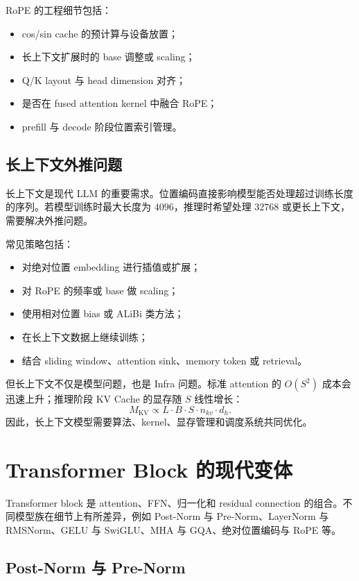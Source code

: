 RoPE 的工程细节包括：

\begin{itemize}
\item cos/sin cache 的预计算与设备放置；
\item 长上下文扩展时的 base 调整或 scaling；
\item Q/K layout 与 head dimension 对齐；
\item 是否在 fused attention kernel 中融合 RoPE；
\item prefill 与 decode 阶段位置索引管理。
\end{itemize}

\subsection{长上下文外推问题}
\label{subsec:long-context-extrapolation}

长上下文是现代 LLM 的重要需求。位置编码直接影响模型能否处理超过训练长度的序列。若模型训练时最大长度为 $4096$，推理时希望处理 $32768$ 或更长上下文，需要解决外推问题。

常见策略包括：

\begin{itemize}
\item 对绝对位置 embedding 进行插值或扩展；
\item 对 RoPE 的频率或 base 做 scaling；
\item 使用相对位置 bias 或 ALiBi 类方法；
\item 在长上下文数据上继续训练；
\item 结合 sliding window、attention sink、memory token 或 retrieval。
\end{itemize}

但长上下文不仅是模型问题，也是 Infra 问题。标准 attention 的 $O(S^2)$ 成本会迅速上升；推理阶段 KV Cache 的显存随 $S$ 线性增长：
\[
M_{\mathrm{KV}}
\propto
L\cdot B\cdot S\cdot n_{kv}\cdot d_h.
\]
因此，长上下文模型需要算法、kernel、显存管理和调度系统共同优化。

\section{Transformer Block 的现代变体}
\label{sec:modern-transformer-block-variants}

Transformer block 是 attention、FFN、归一化和 residual connection 的组合。不同模型族在细节上有所差异，例如 Post-Norm 与 Pre-Norm、LayerNorm 与 RMSNorm、GELU 与 SwiGLU、MHA 与 GQA、绝对位置编码与 RoPE 等。

\subsection{Post-Norm 与 Pre-Norm}
\label{subsec:postnorm-prenorm}

